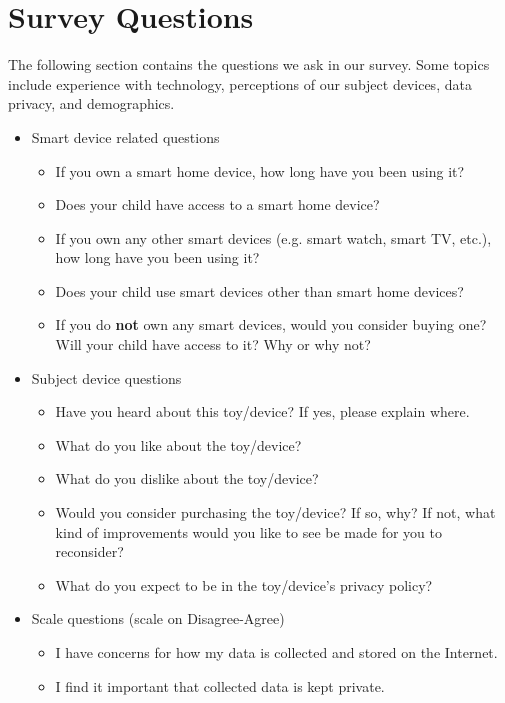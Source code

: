 \documentclass[12pt]{ucthesis}
\begin{document}
\appendix
\chapter{Survey Questions}
\label{app:questions}
The following section contains the questions we ask in our survey. Some topics include experience with technology, perceptions of our subject devices, data privacy, and demographics.

\begin{itemize}
    \item Smart device related questions
    \begin{itemize}
        \item If you own a smart home device, how long have you been using it?
        \item Does your child have access to a smart home device?
        \item If you own any other smart devices (e.g. smart watch, smart TV, etc.), how long have you been using it?
        \item Does your child use smart devices other than smart home devices?
        \item If you do \textbf{not} own any smart devices, would you consider buying one? Will your child have access to it? Why or why not?
    \end{itemize}
    \item Subject device questions
    \begin{itemize}
        \item Have you heard about this toy/device? If yes, please explain where.
        \item What do you like about the toy/device?
        \item What do you dislike about the toy/device?
        \item Would you consider purchasing the toy/device? If so, why? If not, what kind of improvements would you like to see be made for you to reconsider?
        \item What do you expect to be in the toy/device's privacy policy?
    \end{itemize}
    \item Scale questions (scale on Disagree-Agree)
    \begin{itemize}
        \item I have concerns for how my data is collected and stored on the Internet.
        \item I find it important that collected data is kept private.

\end{itemize}
\end{itemize}
\end{document}
